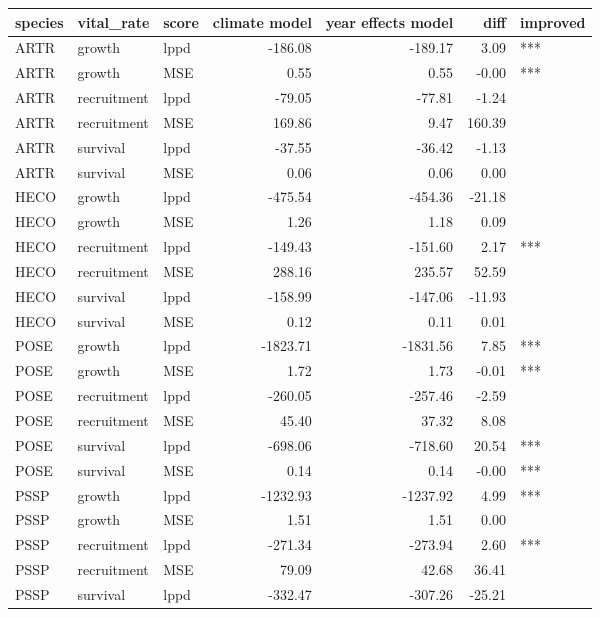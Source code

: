 \documentclass[11pt]{article}
\begin{document}
\begin{table}[ht]
	\centering
	\begin{tabular}{lllrrrl}
		\hline
		species & vital\_rate & score & climate model & year effects model & diff & improved \\ 
		\hline
		ARTR & growth & lppd & -186.08 & -189.17 & 3.09 & *** \\ 
		ARTR & growth & MSE & 0.55 & 0.55 & -0.00 & *** \\ 
		ARTR & recruitment & lppd & -79.05 & -77.81 & -1.24 &  \\ 
		ARTR & recruitment & MSE & 169.86 & 9.47 & 160.39 &  \\ 
		ARTR & survival & lppd & -37.55 & -36.42 & -1.13 &  \\ 
		ARTR & survival & MSE & 0.06 & 0.06 & 0.00 &  \\ 
		HECO & growth & lppd & -475.54 & -454.36 & -21.18 &  \\ 
		HECO & growth & MSE & 1.26 & 1.18 & 0.09 &  \\ 
		HECO & recruitment & lppd & -149.43 & -151.60 & 2.17 & *** \\ 
		HECO & recruitment & MSE & 288.16 & 235.57 & 52.59 &  \\ 
		HECO & survival & lppd & -158.99 & -147.06 & -11.93 &  \\ 
		HECO & survival & MSE & 0.12 & 0.11 & 0.01 &  \\ 
		POSE & growth & lppd & -1823.71 & -1831.56 & 7.85 & *** \\ 
		POSE & growth & MSE & 1.72 & 1.73 & -0.01 & *** \\ 
		POSE & recruitment & lppd & -260.05 & -257.46 & -2.59 &  \\ 
		POSE & recruitment & MSE & 45.40 & 37.32 & 8.08 &  \\ 
		POSE & survival & lppd & -698.06 & -718.60 & 20.54 & *** \\ 
		POSE & survival & MSE & 0.14 & 0.14 & -0.00 & *** \\ 
		PSSP & growth & lppd & -1232.93 & -1237.92 & 4.99 & *** \\ 
		PSSP & growth & MSE & 1.51 & 1.51 & 0.00 &  \\ 
		PSSP & recruitment & lppd & -271.34 & -273.94 & 2.60 & *** \\ 
		PSSP & recruitment & MSE & 79.09 & 42.68 & 36.41 &  \\ 
		PSSP & survival & lppd & -332.47 & -307.26 & -25.21 &  \\ 

\end{tabular}
\end{table}
\end{document}
